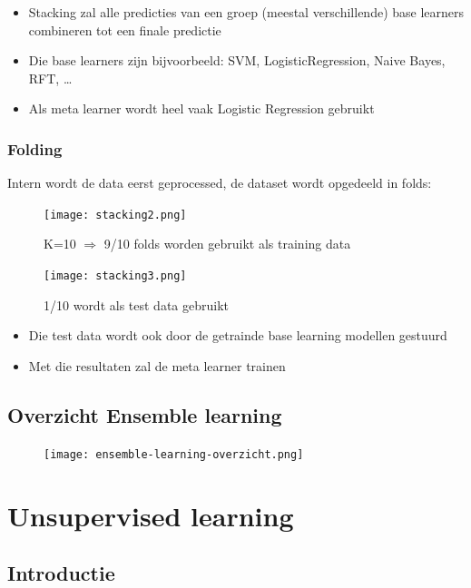 \documentclass{article}
\begin{document}
\begin{itemize}
    \item Stacking zal alle predicties van een groep (meestal verschillende) base learners combineren tot een finale predictie
    \item Die base learners zijn bijvoorbeeld: SVM, LogisticRegression, Naive Bayes, RFT, \dots
    \item Als meta learner wordt heel vaak Logistic Regression gebruikt
\end{itemize}

\subsubsection{Folding}

Intern wordt de data eerst geprocessed, de dataset wordt opgedeeld in folds: 

\begin{figure}[H]
    \centering
    \texttt{[image: stacking2.png]}
    \caption{K=10 $\Rightarrow$ 9/10 folds worden gebruikt als training data}
\end{figure}

\begin{figure}[H]
    \centering
    \texttt{[image: stacking3.png]}
    \caption{1/10 wordt als test data gebruikt}
\end{figure}

\begin{itemize}
    \item Die test data wordt ook door de getrainde base learning modellen gestuurd
    \item Met die resultaten zal de meta learner trainen
\end{itemize}

\subsection{Overzicht Ensemble learning}

\begin{figure}[H]
    \centering
    \texttt{[image: ensemble-learning-overzicht.png]}
\end{figure}

\section{Unsupervised learning}

\subsection{Introductie}
\end{document}

